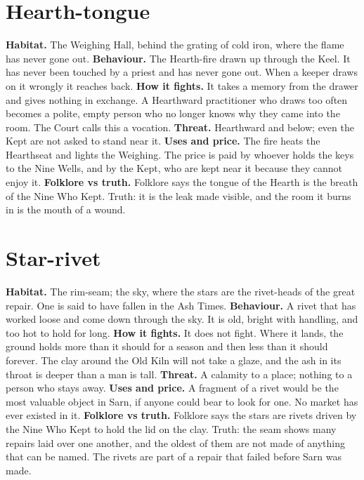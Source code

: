 \documentclass{design/chronicle}
\begin{document}
\section*{Hearth-tongue}

\textbf{Habitat.} The Weighing Hall, behind the grating of cold iron, where the flame has never gone out. \textbf{Behaviour.} The Hearth-fire drawn up through the Keel. It has never been touched by a priest and has never gone out. When a keeper draws on it wrongly it reaches back. \textbf{How it fights.} It takes a memory from the drawer and gives nothing in exchange. A Hearthward practitioner who draws too often becomes a polite, empty person who no longer knows why they came into the room. The Court calls this a vocation. \textbf{Threat.} Hearthward and below; even the Kept are not asked to stand near it. \textbf{Uses and price.} The fire heats the Hearthseat and lights the Weighing. The price is paid by whoever holds the keys to the Nine Wells, and by the Kept, who are kept near it because they cannot enjoy it. \textbf{Folklore vs truth.} Folklore says the tongue of the Hearth is the breath of the Nine Who Kept. Truth: it is the leak made visible, and the room it burns in is the mouth of a wound.

\section*{Star-rivet}

\textbf{Habitat.} The rim-seam; the sky, where the stars are the rivet-heads of the great repair. One is said to have fallen in the Ash Times. \textbf{Behaviour.} A rivet that has worked loose and come down through the sky. It is old, bright with handling, and too hot to hold for long. \textbf{How it fights.} It does not fight. Where it lands, the ground holds more than it should for a season and then less than it should forever. The clay around the Old Kiln will not take a glaze, and the ash in its throat is deeper than a man is tall. \textbf{Threat.} A calamity to a place; nothing to a person who stays away. \textbf{Uses and price.} A fragment of a rivet would be the most valuable object in Sarn, if anyone could bear to look for one. No market has ever existed in it. \textbf{Folklore vs truth.} Folklore says the stars are rivets driven by the Nine Who Kept to hold the lid on the clay. Truth: the seam shows many repairs laid over one another, and the oldest of them are not made of anything that can be named. The rivets are part of a repair that failed before Sarn was made.
\end{document}

